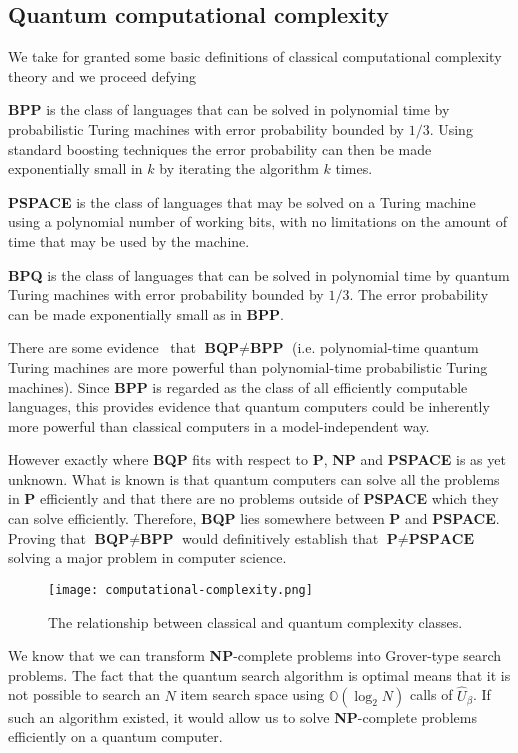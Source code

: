 \subsection{Quantum computational complexity}
We take for granted some basic definitions of classical computational complexity theory and we proceed defying
\begin{defn}
\textbf{BPP} is the class of languages that can be solved in polynomial time by probabilistic Turing machines with error probability bounded by $1/3$. Using standard boosting techniques the error probability can then be made exponentially small in $k$ by iterating the algorithm $k$ times.
\end{defn}
\begin{defn}
\textbf{PSPACE} is the class of languages that may be solved on a Turing machine using a polynomial number of working bits, with no limitations on the amount of time that may be used by the machine.
\end{defn}
\begin{defn}
\textbf{BPQ} is the class of languages that can be solved in polynomial time by quantum Turing machines with error probability bounded by $1/3$. The error probability can be made exponentially small as in \textbf{BPP}.
\end{defn}
There are some evidence~\cite{Bennett_1997} that $\textbf{BQP} \neq \textbf{BPP}$ (i.e. polynomial-time quantum Turing machines are more powerful than polynomial-time probabilistic Turing machines). Since \textbf{BPP} is regarded as the class of all efficiently computable languages, this provides evidence that quantum computers could be inherently more powerful than classical computers in a model-independent way.

However exactly where \textbf{BQP} fits with respect to \textbf{P}, \textbf{NP} and \textbf{PSPACE} is as yet unknown. What is known is that quantum computers can solve all the problems in \textbf{P} efficiently and that there are no problems outside of \textbf{PSPACE} which they can solve efficiently. Therefore, \textbf{BQP} lies somewhere between \textbf{P} and \textbf{PSPACE}.
Proving that $\textbf{BQP} \neq \textbf{BPP}$ would definitively establish that $\textbf{P} \neq \textbf{PSPACE}$ solving a major problem in computer science.


\begin{figure}
\texttt{[image: computational-complexity.png]}
\centering
\caption{The relationship between classical and quantum complexity classes.}
\end{figure}
We know that we can transform \textbf{NP}-complete problems into Grover-type search problems.
The fact that the quantum search algorithm is optimal means that it is not possible to search an $N$ item search space using $\mathbb{O}(\log_2{N})$ calls of $\hat{U}_\beta$. If such an algorithm existed, it would allow us to solve \textbf{NP}-complete problems efficiently on a quantum computer.


